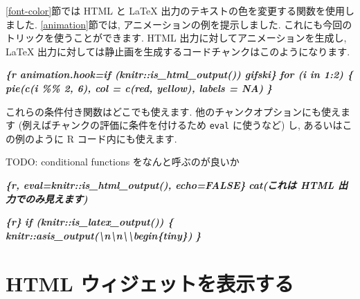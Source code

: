 \documentclass[
  11pt,
]{bxjsreport}
\newenvironment{Shaded}{\begin{snugshade}}{\end{snugshade}}
\newcommand{\InformationTok}[1]{\textcolor[rgb]{0.56,0.35,0.01}{\textbf{\textit{#1}}}}
\begin{document}
\ref{font-color}節では HTML と LaTeX 出力のテキストの色を変更する関数を使用しました. \ref{animation}節では, アニメーションの例を提示しました. これにも今回のトリックを使うことができます. HTML 出力に対してアニメーションを生成し, LaTeX 出力に対しては静止画を生成するコードチャンクはこのようになります.

\begin{Shaded}
\begin{Highlighting}[]
\InformationTok{\textasciigrave{}\textasciigrave{}\textasciigrave{}\{r animation.hook=if (knitr::is\_html\_output()) \textquotesingle{}gifski\textquotesingle{}\}}
\InformationTok{for (i in 1:2) \{}
\InformationTok{  pie(c(i \%\% 2, 6), col = c(\textquotesingle{}red\textquotesingle{}, \textquotesingle{}yellow\textquotesingle{}), labels = NA)}
\InformationTok{\}}
\InformationTok{\textasciigrave{}\textasciigrave{}\textasciigrave{}}
\end{Highlighting}
\end{Shaded}

これらの条件付き関数はどこでも使えます. 他のチャンクオプションにも使えます (例えばチャンクの評価に条件を付けるため \texttt{eval} に使うなど) し, あるいはこの例のように R コード内にも使えます.

TODO: conditional functions をなんと呼ぶのが良いか

\begin{Shaded}
\begin{Highlighting}[]
\InformationTok{\textasciigrave{}\textasciigrave{}\textasciigrave{}\{r, eval=knitr::is\_html\_output(), echo=FALSE\}}
\InformationTok{cat(\textquotesingle{}これは HTML 出力でのみ見えます\textquotesingle{})}
\InformationTok{\textasciigrave{}\textasciigrave{}\textasciigrave{}}

\InformationTok{\textasciigrave{}\textasciigrave{}\textasciigrave{}\{r\}}
\InformationTok{if (knitr::is\_latex\_output()) \{}
\InformationTok{  knitr::asis\_output(\textquotesingle{}\textbackslash{}n\textbackslash{}n\textbackslash{}\textbackslash{}begin\{tiny\}\textquotesingle{})}
\InformationTok{\}}
\InformationTok{\textasciigrave{}\textasciigrave{}\textasciigrave{}}
\end{Highlighting}
\end{Shaded}

\hypertarget{html-widgets}{%
\section{HTML ウィジェットを表示する}\label{html-widgets}}
\end{document}

